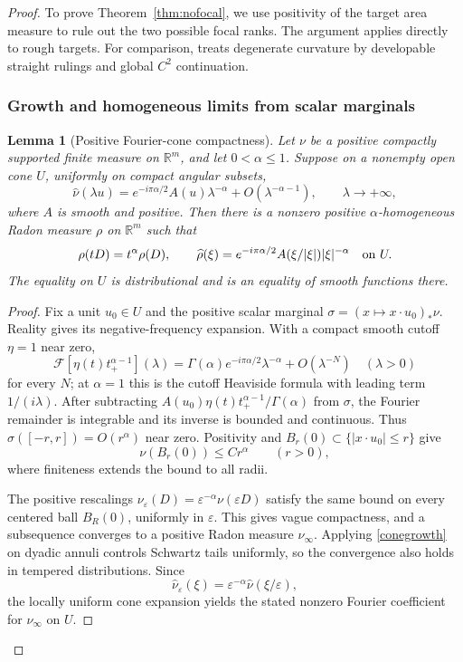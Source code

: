 \documentclass[11pt]{article}
\newtheorem{lemma}[theorem]{Lemma}
\newcommand{\R}{\mathbb R}
\begin{document}
\begin{proof}
To prove Theorem~\ref{thm:nofocal}, we use positivity of the target area measure to rule out the two possible focal ranks. The argument applies directly to rough targets. For comparison, \cite[Lemma 6.3, p.~12]{GHL} treats degenerate curvature by developable straight rulings and global $C^2$ continuation.

\subsubsection{Growth and homogeneous limits from scalar marginals}
\begin{lemma}[Positive Fourier-cone compactness]\label{lem:positivecone}
Let $\nu$ be a positive compactly supported finite measure on $\R^m$, and let $0<\alpha\le1$. Suppose on a nonempty open cone $U$, uniformly on compact angular subsets,
\begin{equation}\label{positiveconeasymptotic}
 \widehat\nu(\lambda u)
 =e^{-i\pi\alpha/2}A(u)\lambda^{-\alpha}
  +O(\lambda^{-\alpha-1}),\qquad \lambda\to+\infty,
\end{equation}
where $A$ is smooth and positive. Then there is a nonzero positive $\alpha$-homogeneous Radon measure $\rho$ on $\R^m$ such that
\[
 \rho(tD)=t^\alpha\rho(D),\qquad
 \widehat\rho(\xi)=e^{-i\pi\alpha/2}
 A(\xi/|\xi|)|\xi|^{-\alpha}\quad\hbox{on }U.
\]
The equality on $U$ is distributional and is an equality of smooth functions there.
\end{lemma}
\begin{proof}
Fix a unit $u_0\in U$ and the positive scalar marginal $\sigma=(x\mapsto x\cdot u_0)_*\nu$. Reality gives its negative-frequency expansion. With a compact smooth cutoff $\eta=1$ near zero,
\[
 \mathcal F[\eta(t)t_+^{\alpha-1}](\lambda)
 =\Gamma(\alpha)e^{-i\pi\alpha/2}\lambda^{-\alpha}
   +O(\lambda^{-N})\quad(\lambda>0)
\]
for every $N$; at $\alpha=1$ this is the cutoff Heaviside formula with leading term $1/(i\lambda)$. After subtracting $A(u_0)\eta(t)t_+^{\alpha-1}/\Gamma(\alpha)$ from $\sigma$, the Fourier remainder is integrable and its inverse is bounded and continuous. Thus $\sigma([-r,r])=O(r^\alpha)$ near zero. Positivity and $B_r(0)\subset\{|x\cdot u_0|\le r\}$ give
\begin{equation}\label{conegrowth}
 \nu(B_r(0))\le Cr^\alpha\qquad(r>0),
\end{equation}
where finiteness extends the bound to all radii.

The positive rescalings $\nu_\varepsilon(D)=\varepsilon^{-\alpha}\nu(\varepsilon D)$ satisfy the same bound on every centered ball $B_R(0)$, uniformly in $\varepsilon$. This gives vague compactness, and a subsequence converges to a positive Radon measure $\nu_\infty$. Applying \eqref{conegrowth} on dyadic annuli controls Schwartz tails uniformly, so the convergence also holds in tempered distributions. Since
\[
 \widehat\nu_\varepsilon(\xi)
 =\varepsilon^{-\alpha}\widehat\nu(\xi/\varepsilon),
\]
the locally uniform cone expansion yields the stated nonzero Fourier coefficient for $\nu_\infty$ on $U$.


\end{proof}
\end{proof}
\end{document}
